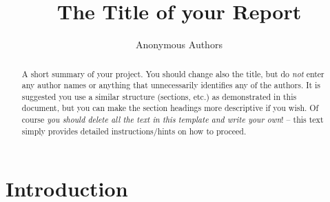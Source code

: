 \documentclass[journal, a4paper]{IEEEtran}
\theoremstyle{plain}
\theoremstyle{definition}
\begin{document}
\title{The Title of your Report}
\author{Anonymous Authors}
\maketitle

\begin{abstract}
	A short summary of your project. You should change also the title, but do \emph{not} enter any author names or anything that unnecessarily identifies any of the authors. It is suggested you use a similar structure (sections, etc.) as demonstrated in this document, but you can make the section headings more descriptive if you wish. Of course \emph{you should delete all the text in this template and write your own}! -- this text simply provides detailed instructions/hints on how to proceed.

\end{abstract}

\section{Introduction}


\end{document}

